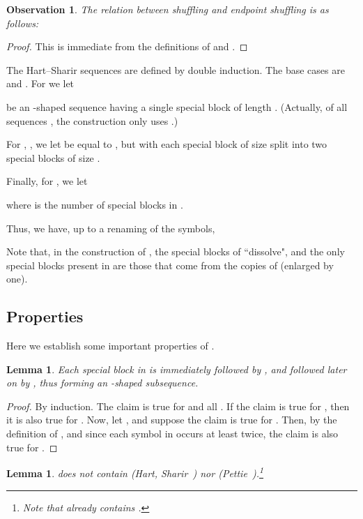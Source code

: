 \documentclass[11pt]{article}
\newtheorem{lemma}[theorem]{Lemma}
\newtheorem{observation}[theorem]{Observation}
\theoremstyle{definition}
\theoremstyle{remark}
\begin{document}
\begin{observation}\label{ref_obs_shuffling}
The relation between shuffling and endpoint shuffling is as follows:

\end{observation}

\begin{proof}
This is immediate from the definitions of  and .
\end{proof}

The Hart--Sharir sequences  are defined by double induction. The base cases are  and . For  we let

be an -shaped sequence having a single special block of length . (Actually, of all sequences , the construction only uses .)

For , , we let  be equal to , but with each special block of size  split into two special blocks of size .

Finally, for , we let

where  is the number of special blocks in .

Thus, we have, up to a renaming of the symbols,

Note that, in the construction of , the special blocks of  ``dissolve", and the only special blocks present in  are those that come from the copies of  (enlarged by one).

\subsection{Properties}

Here we establish some important properties of .

\begin{lemma}\label{lemma_SB_N}
Each special block  in  is immediately followed by , and followed later on by , thus forming an -shaped subsequence.
\end{lemma}

\begin{proof}
By induction. The claim is true for  and all . If the claim is true for , then it is also true for . Now, let , and suppose the claim is true for . Then, by the definition of , and since each symbol in  occurs at least twice, the claim is also true for .
\end{proof}

\begin{lemma}
 does not contain  (Hart, Sharir~\cite{HS}) nor  (Pettie~\cite{pettie_origins}).\footnote{Note that  already contains .}
\end{lemma}
\end{document}
